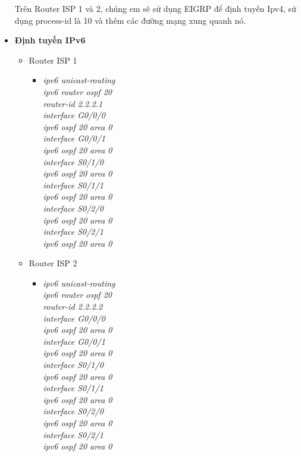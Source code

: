\documentclass[12pt,a4paper]{report}
\begin{document}
\begin{itemize}
\begin{itemize}
\begin{itemize}
          \end{itemize}
       \end{itemize}
     \hspace*{1cm} Trên Router ISP 1 và 2, chúng em sẽ sử dụng EIGRP để định tuyến Ipv4, sử dụng process-id là 10 và thêm các đường mạng xung quanh nó.\\
       \item \textbf{Định tuyến IPv6}
      \begin{itemize}
        \item Router ISP 1
        \begin{itemize}
          \item \textit{ipv6 unicast-routing\\
ipv6 router ospf 20\\
router-id 2.2.2.1\\
interface G0/0/0\\
ipv6 ospf 20 area 0\\
interface G0/0/1\\
ipv6 ospf 20 area 0\\
interface S0/1/0\\
ipv6 ospf 20 area 0\\
interface S0/1/1\\
ipv6 ospf 20 area 0\\
interface S0/2/0\\
ipv6 ospf 20 area 0\\
interface S0/2/1\\
ipv6 ospf 20 area 0\\}
       
        \end{itemize}
        \item Router ISP 2
        \begin{itemize}
         \item \textit{ipv6 unicast-routing\\
ipv6 router ospf 20\\
router-id 2.2.2.2\\
interface G0/0/0\\
ipv6 ospf 20 area 0\\
interface G0/0/1\\
ipv6 ospf 20 area 0\\
interface S0/1/0\\
ipv6 ospf 20 area 0\\
interface S0/1/1\\
ipv6 ospf 20 area 0\\
interface S0/2/0\\
ipv6 ospf 20 area 0\\
interface S0/2/1\\
ipv6 ospf 20 area 0\\}
        

\end{itemize}
\end{itemize}
\end{itemize}
\end{document}

